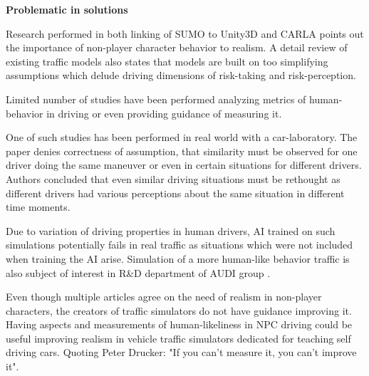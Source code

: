 \documentclass{VUMIFPS-master-intro}
\begin{document}
\textbf{Problematic in solutions}

Research performed in both linking of SUMO to Unity3D and CARLA points out the importance of non-player character behavior to realism. A detail review \cite{Eskandarian2017} of existing traffic models also states that models are built on too simplifying assumptions which delude driving dimensions of risk-taking and risk-perception.


Limited number of studies have been performed analyzing metrics of human-behavior in driving or even providing guidance of measuring it. 

One of such studies has been performed in real world with a car-laboratory. The paper denies correctness of assumption, that similarity must be observed for one driver doing the same maneuver or even in certain situations for different drivers. Authors concluded that even similar driving situations must be rethought as different drivers had various perceptions about the same situation in different time moments. \cite{Blaszczyk2015}


Due to variation of driving properties in human drivers, AI trained on such simulations potentially fails in real traffic as situations which were not included when training the AI arise. Simulation of a more human-like behavior traffic is also subject of interest in R\&D department of AUDI group \cite{AUDI2018}.

Even though multiple articles agree on the need of realism in non-player characters, the creators of traffic simulators do not have guidance improving it. Having aspects and measurements of human-likeliness in NPC driving could be useful improving realism in vehicle traffic simulators dedicated for teaching self driving cars. Quoting Peter Drucker: "If you can't measure it, you can't improve it".


\end{document}
